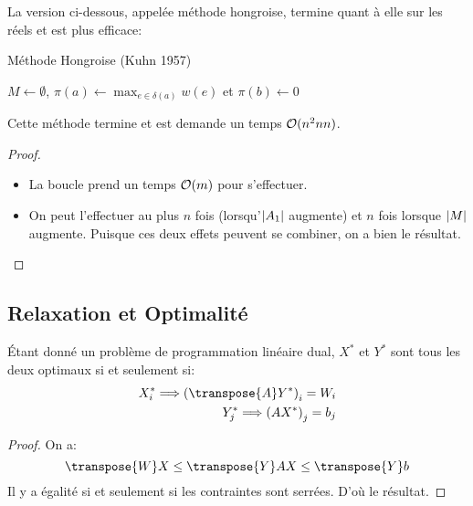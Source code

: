 \documentclass[math, info]{cours}
\begin{document}
La version ci-dessous, appelée méthode hongroise, termine quant à elle sur les réels et est plus efficace:
\begin{algorithm}
	\caption{Méthode Hongroise (Kuhn 1957)}
	\begin{algorithmic}
		\State $M \gets \emptyset$, $\displaystyle\pi(a) \gets \max_{e \in \delta(a)} w(e)$ et $\pi(b) \gets 0$
			\EndIf
		 \EndWhile
	\end{algorithmic}
\end{algorithm}

\begin{thm}
	Cette méthode termine et est demande un temps $\mathcal{O}(n^{2}nn)$.
\end{thm}
\begin{proof}
	\begin{itemize}
		\item La boucle prend un temps $\mathcal{O}(m)$ pour s'effectuer.
		\item On peut l'effectuer au plus $n$ fois (lorsqu'$\left|A_{1}\right|$ augmente) et $n$ fois lorsque $\left|M\right|$ augmente.
			Puisque ces deux effets peuvent se combiner, on a bien le résultat.
	\end{itemize}
\end{proof}

\subsection{Relaxation et Optimalité}
\begin{proposition}[Relaxation]
	Étant donné un problème de programmation linéaire dual, $X^{*}$ et $Y^{*}$ sont tous les deux optimaux si et seulement si:
	\begin{align*}
		X_{i}^{*} \Longrightarrow \left(\transpose{A}Y^{*}\right)_{i} = W_{i}\\
		Y_{j}^{*} \Longrightarrow \left(AX^{*}\right)_{j} = b_{j}
	\end{align*}
	\label{prop:relaxation}
\end{proposition}
\begin{proof}
	On a:
	\begin{equation*}
		\transpose{W}X \leq \transpose{Y}AX \leq \transpose{Y}b
	\end{equation*}
	Il y a égalité si et seulement si les contraintes sont serrées.
	D'où le résultat.
\end{proof}
\end{document}
